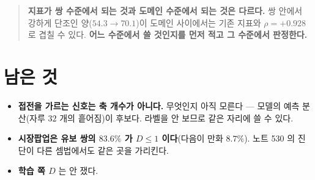 \documentclass[11pt]{article}
\begin{document}
\begin{quote}
\textbf{지표가 쌍 수준에서 되는 것과 도메인 수준에서 되는 것은 다르다.}
쌍 안에서 강하게 단조인 양($54.3 \to 70.1$)이 도메인 사이에서는 기존 지표와
$\rho = +0.928$ 로 겹칠 수 있다. \textbf{어느 수준에서 쓸 것인지를 먼저 적고
그 수준에서 판정한다.}
\end{quote}

\section*{남은 것}

\begin{itemize}
\item \textbf{접전을 가르는 신호는 축 개수가 아니다.} 무엇인지 아직 모른다 ---
모델의 예측 분산(자루 $32$ 개의 흩어짐)이 후보다. 라벨을 안 보므로 같은 자리에
쓸 수 있다.
\item \textbf{시장팝업은 유보 쌍의 $83.6\%$ 가 $D \le 1$ 이다}(다음이 만화
$8.7\%$). 노트 530 의 진단이 다른 셈법에서도 같은 곳을 가리킨다.
\item \textbf{학습 쪽 $D$} 는 안 쟀다.
\end{itemize}
\end{document}
